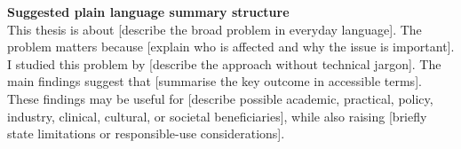 \textbf{Suggested plain language summary structure}\\
This thesis is about [describe the broad problem in everyday language]. The problem matters because [explain who is affected and why the issue is important]. I studied this problem by [describe the approach without technical jargon]. The main findings suggest that [summarise the key outcome in accessible terms]. These findings may be useful for [describe possible academic, practical, policy, industry, clinical, cultural, or societal beneficiaries], while also raising [briefly state limitations or responsible-use considerations].


